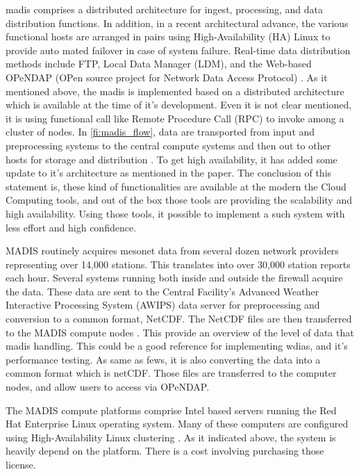 \acrshort{madis} comprises a distributed architecture for ingest, processing, and data distribution functions.
In addition, in a recent architectural advance, the various functional hosts are arranged in pairs using High-Availability (HA) Linux to provide auto mated failover in case of system failure. Real-time data distribution methods include FTP, Local Data Manager (LDM), and the Web-based OPeNDAP (OPen source project for Network Data Access Protocol) \cite{Macdermaid2005ARCHITECTUREP2.39}. As it mentioned above, the \acrshort{madis} is implemented based on a distributed architecture which is available at the time of it's development. Even it is not clear mentioned, it is using functional call like Remote Procedure Call (RPC) to invoke among a cluster of nodes. In \cref{fi:madis_flow}, data are transported from input and preprocessing systems to the central compute systems and then out to other hosts for storage and distribution \cite{Macdermaid2005ARCHITECTUREP2.39}. To get high availability, it has added some update to it's architecture as mentioned in the paper. The conclusion of this statement is, these kind of functionalities are available at the modern the Cloud Computing tools, and out of the box those tools are providing the scalability and high availability. Using those tools, it possible to implement a such system with less effort and high confidence.

MADIS routinely acquires mesonet data from several dozen network providers representing over 14,000 stations. This translates into over 30,000 station reports each hour. Several systems running both inside and outside the firewall acquire the data. These data are sent to the Central Facility's Advanced Weather Interactive Processing System (AWIPS) data server for preprocessing and conversion to a common format, NetCDF. The NetCDF files are then transferred to the MADIS compute nodes \cite{Macdermaid2005ARCHITECTUREP2.39}. This provide an overview of the level of data that \acrshort{madis} handling. This could be a good reference for implementing \acrshort{wdias}, and it's performance testing. As same as \acrshort{fews}, it is also converting the data into a common format which is \acrshort{netCDF}. Those files are transferred to the computer nodes, and allow users to access via OPeNDAP.

The MADIS compute platforms comprise Intel based servers running the Red Hat Enterprise Linux operating system. Many of these computers are configured using High-Availability Linux clustering \cite{Macdermaid2005ARCHITECTUREP2.39}. As it indicated above, the system is heavily depend on the platform. There is a cost involving purchasing those license.

